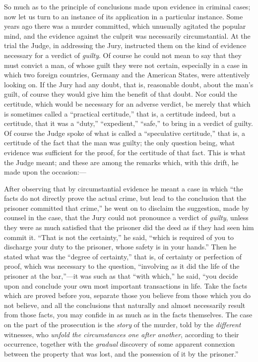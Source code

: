 So much as to the principle of conclusions made upon evidence in
criminal cases; now let us turn to an instance of its application in a
particular instance. Some years ago there was a murder committed,
which unusually agitated the popular mind, and the evidence against
the culprit was necessarily circumstantial. At the trial the Judge, in
addressing the Jury, instructed them on the kind of evidence necessary
for a verdict of \emph{guilty}. Of course he could not mean to say
that they must convict a man, of whose guilt they were not certain,
especially in a case in which two foreign countries, Germany and the
American States, were attentively looking on. If the Jury had any
doubt, that is, reasonable doubt, about the man's guilt, of course
they would give him the benefit of that doubt. Nor could the
certitude, which would be necessary for an adverse verdict, be merely
that which is sometimes called a ``practical certitude,'' that
is, a certitude indeed, but a certitude, that it was a
``duty,'' ``expedient,'' ``safe,'' to bring in
a verdict of guilty. Of course the Judge spoke of what is called a
``speculative certitude,'' that is, a certitude of the fact
that the man was guilty; the only question being, what evidence was
sufficient for the proof, for the certitude of that fact. This is what
the Judge meant; and these are among the remarks which, with this
drift, he made upon the occasion:—

After observing that by circumstantial evidence he meant a case in
which ``the facts do not directly prove the actual crime, but lead
to the conclusion that the prisoner committed that crime,'' he
went on to disclaim the suggestion, made by counsel in the case, that
the Jury could not pronounce a verdict of \emph{guilty}, unless they were as
much satisfied that the prisoner did the deed as if they had seen him
commit it. ``That is not the certainty,'' he said, ``which
is required of you to discharge your duty to the prisoner, whose
safety is in your hands.'' Then he stated what was the
``degree of certainty,'' that is, of certainty or perfection
of proof, which was necessary to the question, ``involving as it
did the life of the prisoner at the bar,''—it was such as that
``with which,'' he said, ``you decide upon and conclude
your own most important transactions in life. Take the facts which are
proved before you, separate those you believe from those which you do
not believe, and all the conclusions that naturally and almost
necessarily result from those facts, you may confide in as much as in
the facts themselves. The case on the part of the prosecution is the \emph{story}
of the murder, told by the \emph{different} witnesses, who \emph{unfold
the circumstances one after another}, according to their
occurrence, together with the \emph{gradual} discovery of some
apparent connexion between the property that was lost, and the
possession of it by the prisoner.''


